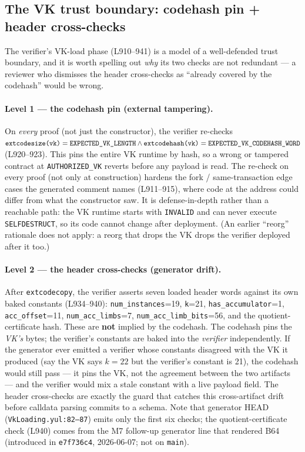 \subsection{The VK trust boundary: codehash pin + header cross-checks}
\label{sec:pr-vk-trust}

The verifier's VK-load phase (L910--941) is a model of a
well-defended trust boundary, and it is worth spelling out
\emph{why} its two checks are not redundant --- a reviewer who
dismisses the header cross-checks as ``already covered by the
codehash'' would be wrong.

\paragraph{Level 1 --- the codehash pin (external tampering).}
On \emph{every} proof (not just the constructor), the verifier
re-checks
$\texttt{extcodesize(vk)} = \texttt{EXPECTED\_\allowbreak{}VK\_\allowbreak{}LENGTH}
\land \texttt{extcodehash(vk)} =
\texttt{EXPECTED\_\allowbreak{}VK\_\allowbreak{}CODEHASH\_\allowbreak{}WORD}$ (L920--923). This pins
the entire VK runtime by hash, so a wrong or tampered contract at
\texttt{AUTHORIZED\_VK} reverts before any payload is read. The
re-check on every proof (not only at construction) hardens the
fork / same-transaction edge cases the generated comment names
(L911--915), where code at the address could differ from what the
constructor saw. It is defense-in-depth rather than a reachable
path: the VK runtime starts with \texttt{INVALID} and can never
execute \texttt{SELFDESTRUCT}, so its code cannot change after
deployment. (An earlier ``reorg'' rationale does not apply: a reorg
that drops the VK drops the verifier deployed after it too.)

\paragraph{Level 2 --- the header cross-checks (generator drift).}
After \texttt{extcodecopy}, the verifier asserts seven loaded
header words against its own baked constants (L934--940):
\texttt{num\_instances}=19, \texttt{k}=21,
\texttt{has\_accumulator}=1, \texttt{acc\_offset}=11,
\texttt{num\_acc\_limbs}=7, \texttt{num\_\allowbreak{}acc\_\allowbreak{}limb\_\allowbreak{}bits}=56,
and the quotient-certificate hash. These are \textbf{not}
implied by the codehash. The codehash pins the \emph{VK's}
bytes; the verifier's constants are baked into the
\emph{verifier} independently. If the generator ever emitted a
verifier whose constants disagreed with the VK it produced (say
the VK says $k=22$ but the verifier's constant is 21), the
codehash would still pass --- it pins the VK, not the agreement
between the two artifacts --- and the verifier would mix a stale
constant with a live payload field. The header cross-checks are
exactly the guard that catches this cross-artifact drift before
calldata parsing commits to a schema. Note that generator HEAD
(\texttt{VkLoading.yul:82--87}) emits only the first six checks; the
quotient-certificate check (L940) comes from the M7 follow-up
generator line that rendered B64 (introduced in \texttt{e7f736c4},
2026-06-07; not on \texttt{main}).

